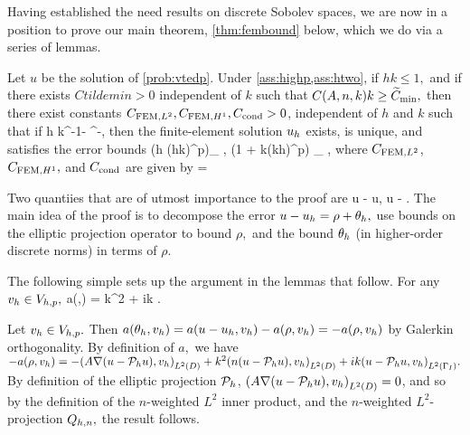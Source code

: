 Having established the need results on discrete Sobolev spaces, we are now in a position to prove our main theorem, \cref{thm:fembound} below, which we do via a series of lemmas.

\label{thm:fembound}
Let $u$ be the solution of \cref{prob:vtedp}. Under \cref{ass:highp,ass:htwo}, if $hk \leq 1,$ and if there exists $Ctildemin > 0$ independent of $k$ such that $\CAnk k \geq \Ctildemin,$ then there exist constants $C_{\mathrm{FEM},L^{2}}, C_{\mathrm{FEM},H^{1}}, C_{\mathrm{cond}} > 0$, independent of $h$ and $k$ such that if
\beq\label{eq:hfemcond}
h \leq \Chcond k^{-1-} \CAnk^{-},
\eeq
then the finite-element solution $u_{h}$ exists, is unique, and satisfies the error bounds
\beqs
{} \leq \CFEMLt \mleft(h \CAnk (hk)^{p}\mright)\inf_{\vh \in \Vhp} , \tand
\eeqs
\beqs
{} \leq \CFEMHo \mleft(1 + \CAnk k(kh)^p\mright) \inf_{\vh \in \Vhp} ,
\eeqs{}
where $C_{\mathrm{FEM},L^{2}}$, $C_{\mathrm{FEM},H^{1}},$ and $C_{\mathrm{cond}}$ are given by
\beqs
\Chcond =  \min{}
\eeqs{}
\enth

Two quantiies that are of utmost importance to the proof are
\beqs
\rho \de u - \Ph u, \tand
\eeqs
\beqs
\thetah \de \Ph u - \uh.
\eeqs
The main idea of the proof is to decompose the error $u - u_{h} = \rho + \theta_{h},$ use bounds on the elliptic projection operator to bound $\rho,$ and the bound $\theta_{h}$ (in higher-order discrete norms) in terms of $\rho.$

The following simple  sets up the argument in the lemmas that follow.
\label{lem:simpleform}
For any $v_{h} \in V_{h,p},$
\beq\label{eq:thetaform}
a(\thetah,\vh) = k^2\IPLtDn{\Qhn\rho}{\vh} + ik \IPLtGI{\rho}{\vh}.
\eeq
\ele

Let $v_{h} \in V_{h,p}.$ Then $a(\theta_{h},v_{h}) = a(u-u_{h},v_{h}) - a(\rho,v_{h}) = -a(\rho,v_{h})$ by Galerkin orthogonality. By definition of $a,$ we have $-a(\rho,\vh) = -\IPLtD{A\grad\mleft(u-\Ph u\mright)}{\vh} + k^2 \IPLtD{n\mleft(u-\Ph u\mright)}{\vh} + ik\IPLtGI{u-\Ph u}{\vh}.$ By definition of the elliptic projection $\mathcal P_{h}$, $\IPLtD{A\grad\mleft(u-\Ph u\mright)}{\vh} = 0$, and so by the definition of the $n$-weighted $L^2$ inner product, and the $n$-weighted $L^2$-projection $Q_{h,n},$ the result follows.
\epf

